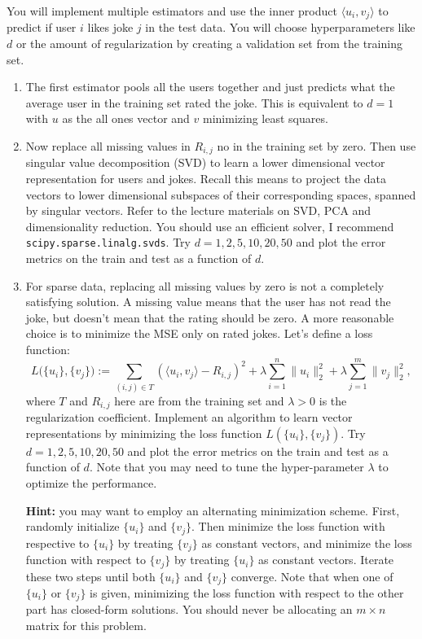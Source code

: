 \documentclass{article}
\newcommand{\1}{\mathbf{1}}
\begin{document}
You will implement multiple estimators and use the inner product $\langle u_i,v_j\rangle$ to predict if user $i$ likes joke $j$ in the test data.
You will choose hyperparameters like $d$ or the amount of regularization by creating a validation set from the training set.

\begin{enumerate}
\item The first estimator pools all the users together and just predicts what the average user in the training set rated the joke. This is equivalent to $d=1$ with $u$ as the all ones vector and $v$ minimizing least squares.    

\item Now replace all missing values in $R_{i,j}$ no in the training set by zero. Then use singular value decomposition (SVD) to learn a lower dimensional vector representation for users and jokes. Recall this means to project the data vectors to lower dimensional subspaces of their corresponding spaces, spanned by singular vectors. Refer to the lecture materials on SVD, PCA and dimensionality reduction. You should use an efficient solver, I recommend \texttt{scipy.sparse.linalg.svds}. Try $d=1,2,5,10,20,50$ and plot the error metrics on the train and test as a function of $d$. 

\item For sparse data, replacing all missing values by zero is not a completely satisfying solution. A missing value means that the user has not read the joke, but doesn't mean that the rating should be zero. A more reasonable choice is to minimize the MSE only on rated jokes. Let's define a loss function:
\[
  L\Big(\{u_i\},\{v_j\}\Big) := \sum_{(i,j)\in T} (\langle u_i,v_j\rangle - R_{i,j})^2
  + \lambda \sum_{i=1}^n \|u_i\|_2^2 + \lambda \sum_{j=1}^m \|v_j\|_2^2,
\]
where $T$ and $R_{i,j}$ here are from the training set and $\lambda > 0$ is the regularization coefficient. Implement an algorithm to learn vector representations by minimizing the loss function $L(\{u_i\},\{v_j\})$.
Try $d=1,2,5,10,20,50$ and plot the error metrics on the train and test as a function of $d$. 
Note that you may need to tune the hyper-parameter $\lambda$ to optimize the performance.

{\bf Hint:} you may want to employ an alternating minimization scheme. First, randomly initialize $\{u_i\}$ and $\{v_j\}$. Then minimize the loss function with respective to $\{u_i\}$ by treating $\{v_j\}$ as constant vectors, and minimize the loss function with respect to $\{v_j\}$ by treating $\{u_i\}$ as constant vectors. Iterate these two steps until both $\{u_i\}$ and $\{v_j\}$ converge. Note that when one of $\{u_i\}$ or $\{v_j\}$ is given, minimizing the loss function with respect to the other part has closed-form solutions. You should never be allocating an $m \times n$ matrix for this problem. 


\end{enumerate}
\end{document}
